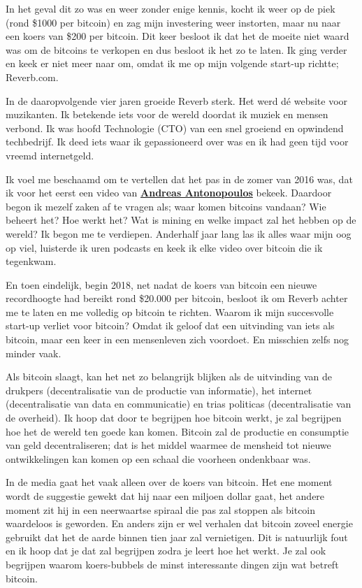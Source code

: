 In het geval dit zo was en weer zonder enige kennis, kocht ik weer op de piek (rond \$1000 per bitcoin) en zag mijn investering weer instorten, maar nu naar een koers van \$200 per bitcoin. Dit keer besloot ik dat het de moeite niet waard was om de bitcoins te verkopen en dus besloot ik het zo te laten. Ik ging verder en keek er niet meer naar om, omdat ik me op mijn volgende start-up richtte; Reverb.com. 

In de daaropvolgende vier jaren groeide Reverb sterk. Het werd dé website voor muzikanten. Ik betekende iets voor de wereld doordat ik muziek en mensen verbond. Ik was hoofd Technologie (CTO) van een snel groeiend en opwindend techbedrijf. Ik deed iets waar ik gepassioneerd over was en ik had geen tijd voor vreemd internetgeld.

Ik voel me beschaamd om te vertellen dat het pas in de zomer van 2016 was, dat ik voor het eerst een video van \href{https://www.youtube.com/channel/UCJWCJCWOxBYSi5DhCieLOLQ}{\textbf{Andreas Antonopoulos}} bekeek. Daardoor begon ik mezelf zaken af te vragen als; waar komen bitcoins vandaan? Wie beheert het? Hoe werkt het? Wat is mining en welke impact zal het hebben op de wereld? Ik begon me te verdiepen. Anderhalf jaar lang las ik alles waar mijn oog op viel, luisterde ik uren podcasts en keek ik elke video over bitcoin die ik tegenkwam.

En toen eindelijk, begin 2018, net nadat de koers van bitcoin een nieuwe recordhoogte had bereikt rond \$20.000 per bitcoin, besloot ik om Reverb achter me te laten en me volledig op bitcoin te richten. Waarom ik mijn succesvolle start-up verliet voor bitcoin? Omdat ik geloof dat een uitvinding van iets als bitcoin, maar een keer in een mensenleven zich voordoet. En misschien zelfs nog minder vaak.

Als bitcoin slaagt, kan het net zo belangrijk blijken als de uitvinding van de drukpers (decentralisatie van de productie van informatie), het internet (decentralisatie van data en communicatie) en trias politicas (decentralisatie van de overheid). Ik hoop dat door te begrijpen hoe bitcoin werkt, je zal begrijpen hoe het de wereld ten goede kan komen. Bitcoin zal de productie en consumptie van geld decentraliseren; dat is het middel waarmee de mensheid tot nieuwe ontwikkelingen kan komen op een schaal die voorheen ondenkbaar was.

In de media gaat het vaak alleen over de koers van bitcoin. Het ene moment wordt de suggestie gewekt dat hij naar een miljoen dollar gaat, het andere moment zit hij in een neerwaartse spiraal die pas zal stoppen als bitcoin waardeloos is geworden. En anders zijn er wel verhalen dat bitcoin zoveel energie gebruikt dat het de aarde binnen tien jaar zal vernietigen. Dit is natuurlijk fout en ik hoop dat je dat zal begrijpen zodra je leert hoe het werkt. Je zal ook begrijpen waarom koers-bubbels de minst interessante dingen zijn wat betreft bitcoin. 

